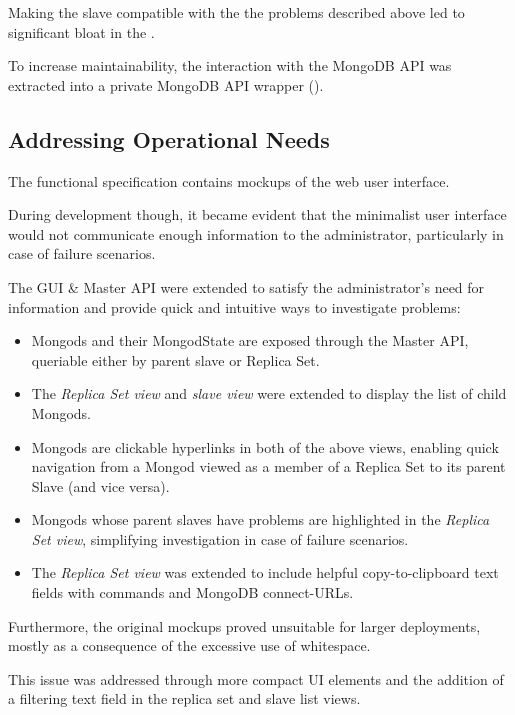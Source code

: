 Making the slave compatible with the the problems described above led to significant bloat in the .

To increase maintainability, the interaction with the MongoDB API was extracted into a private MongoDB API wrapper ().

\subsection{Addressing Operational Needs}\label{di:opneeds}

The functional specification contains mockups of the \mamid web user interface.

During development though, it became evident that the minimalist user interface would not communicate enough information
to the administrator, particularly in case of failure scenarios.

The GUI \& Master API were extended to satisfy the administrator's need for information and provide
quick and intuitive ways to investigate problems:

\begin{itemize}
  \item Mongods and their MongodState are exposed through the Master API, queriable either by parent slave or Replica Set.
  \item The \textit{Replica Set view} and \textit{slave view} were extended to display the list of child Mongods.
  \item Mongods are clickable hyperlinks in both of the above views, enabling quick navigation from a Mongod
          viewed as a member of a Replica Set to its parent Slave (and vice versa).
  \item Mongods whose parent slaves have problems are highlighted in the \textit{Replica Set view},
          simplifying investigation in case of failure scenarios.
  \item The \textit{Replica Set view} was extended to include helpful copy-to-clipboard text fields with commands and MongoDB connect-URLs.
\end{itemize}

Furthermore, the original mockups proved unsuitable for larger deployments, mostly as a consequence of the excessive use of whitespace.

This issue was addressed through more compact UI elements and the addition of a filtering text field in the replica set and slave list views.

